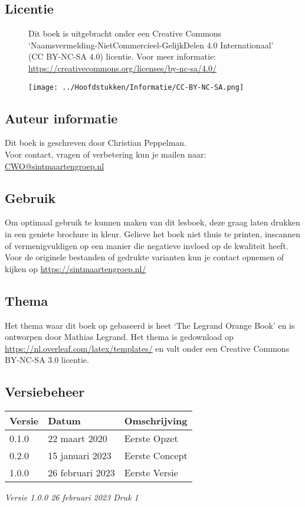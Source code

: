 \subsection*{Licentie}
\begin{figure}[H]
	\centering
	\begin{minipage}[t]{0.60\textwidth}
		\vspace{-1.80cm}
		Dit boek is uitgebracht onder een Creative Commons
		`Naamsvermelding-NietCommercieel-GelijkDelen 4.0 Internationaal' (CC BY-NC-SA 4.0) licentie. Voor meer informatie: \url{https://creativecommons.org/licenses/by-nc-sa/4.0/}
	\end{minipage}
	\hfill
	\begin{minipage}[b]{0.35\textwidth}
	\texttt{[image: ../Hoofdstukken/Informatie/CC-BY-NC-SA.png]}
\end{minipage}
\end{figure}
\subsection*{Auteur informatie}
Dit boek is geschreven door Christian Peppelman.\\ 
Voor contact, vragen of verbetering kun je mailen naar: \href{mailto:cwo@sintmaartengroep.nl}{CWO@sintmaartengroep.nl} 
\subsection*{Gebruik}
Om optimaal gebruik te kunnen maken van dit lesboek, deze graag laten drukken in een geniete brochure in kleur. Gelieve het boek niet thuis te printen, inscannen of vermenigvuldigen op een manier die negatieve invloed op de kwaliteit heeft. Voor de originele bestanden of gedrukte varianten kun je contact opnemen of kijken op \url{https://sintmaartengroep.nl/}
\subsection*{Thema}
Het thema waar dit boek op gebaseerd is heet `The Legrand Orange Book' en is ontworpen door Mathias Legrand. Het thema is gedownload op \url{https://nl.overleaf.com/latex/templates/} en valt onder een Creative Commons BY-NC-SA 3.0 licentie.
\subsection*{Versiebeheer}
\begin{table}[H]
	\centering
	\begin{tabular}{l|l|p{8cm}}
		\textbf{Versie} & \textbf{Datum} & \textbf{Omschrijving} \\ \hline
		0.1.0 & 22 maart 2020 & Eerste Opzet  \\ \hline
	    0.2.0 & 15 januari 2023 & Eerste Concept  \\ \hline
	    1.0.0 & 26 februari 2023 & Eerste Versie  \\
	\end{tabular}
\end{table}



\textit{Versie 1.0.0 \hspace{1 cm} 26 februari 2023 \hspace{1cm} Druk 1}
